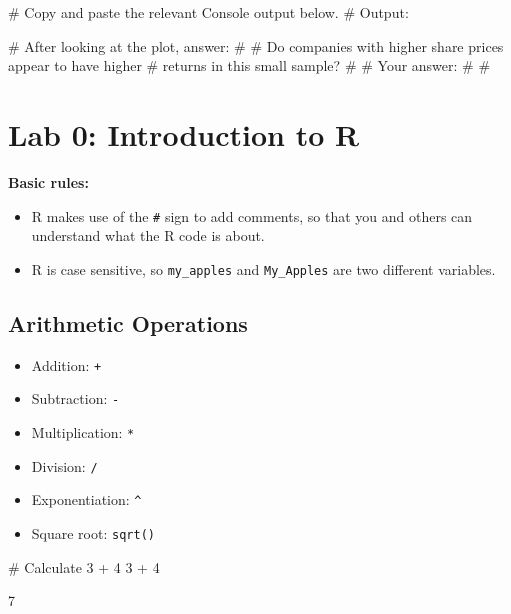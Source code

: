 \documentclass[
  12pt,
  letterpaper,
]{scrbook}
\newenvironment{Shaded}{\begin{snugshade}}{\end{snugshade}}
\newcommand{\CommentTok}[1]{\textcolor[rgb]{0.37,0.37,0.37}{#1}}
\newcommand{\DecValTok}[1]{\textcolor[rgb]{0.68,0.00,0.00}{#1}}
\newcommand{\SpecialCharTok}[1]{\textcolor[rgb]{0.37,0.37,0.37}{#1}}
\providecommand{\tightlist}{%
  \setlength{\itemsep}{0pt}\setlength{\parskip}{0pt}}
\renewcommand{\tightlist}{\setlength{\itemsep}{0.5\baselineskip}\setlength{\parskip}{0.2\baselineskip}}
\theoremstyle{plain}
\theoremstyle{definition}
\theoremstyle{remark}
\begin{document}
\begin{Shaded}
\begin{Highlighting}[]
\CommentTok{\# Copy and paste the relevant Console output below.}
\CommentTok{\# Output:}


\CommentTok{\# After looking at the plot, answer:}
\CommentTok{\#}
\CommentTok{\# Do companies with higher share prices appear to have higher}
\CommentTok{\# returns in this small sample?}
\CommentTok{\#}
\CommentTok{\# Your answer:}
\CommentTok{\#}
\CommentTok{\#}
\end{Highlighting}
\end{Shaded}

\chapter{Lab 0: Introduction to R}\label{lab-0-introduction-to-r}

\textbf{Basic rules:}

\begin{itemize}
\tightlist
\item
  R makes use of the \texttt{\#} sign to add comments, so that you and
  others can understand what the R code is about.
\item
  R is case sensitive, so \texttt{my\_apples} and \texttt{My\_Apples}
  are two different variables.
\end{itemize}

\section{Arithmetic Operations}\label{arithmetic-operations}

\begin{itemize}
\tightlist
\item
  Addition: \texttt{+}
\item
  Subtraction: \texttt{-}
\item
  Multiplication: \texttt{*}
\item
  Division: \texttt{/}
\item
  Exponentiation: \texttt{\^{}}
\item
  Square root: \texttt{sqrt()}
\end{itemize}

\begin{Shaded}
\begin{Highlighting}[]
\CommentTok{\# Calculate 3 + 4}
\DecValTok{3} \SpecialCharTok{+} \DecValTok{4}
\end{Highlighting}
\end{Shaded}

7
\end{document}
